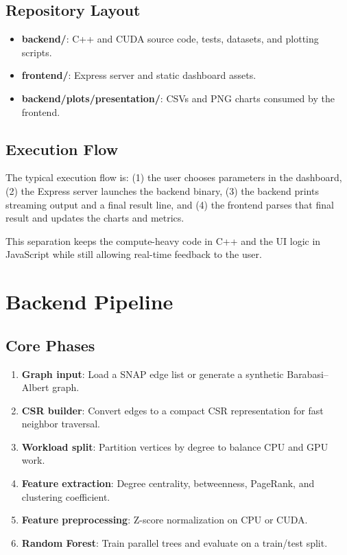 \documentclass[11pt]{article}
\let\oldsection\section
\renewcommand{\section}{\clearpage\oldsection}
\begin{document}
\subsection{Repository Layout}
\begin{itemize}
  \item \textbf{backend/}: C++ and CUDA source code, tests, datasets, and plotting scripts.
  \item \textbf{frontend/}: Express server and static dashboard assets.
  \item \textbf{backend/plots/presentation/}: CSVs and PNG charts consumed by the frontend.
\end{itemize}

\subsection{Execution Flow}
The typical execution flow is:
(1) the user chooses parameters in the dashboard, (2) the Express server launches the backend binary, (3) the backend prints streaming output and a final result line, and (4) the frontend parses that final result and updates the charts and metrics.

This separation keeps the compute-heavy code in C++ and the UI logic in JavaScript while still allowing real-time feedback to the user.

\section{Backend Pipeline}
\subsection{Core Phases}
\begin{enumerate}
  \item \textbf{Graph input}: Load a SNAP edge list or generate a synthetic Barabasi--Albert graph.
  \item \textbf{CSR builder}: Convert edges to a compact CSR representation for fast neighbor traversal.
  \item \textbf{Workload split}: Partition vertices by degree to balance CPU and GPU work.
  \item \textbf{Feature extraction}: Degree centrality, betweenness, PageRank, and clustering coefficient.
  \item \textbf{Feature preprocessing}: Z-score normalization on CPU or CUDA.
  \item \textbf{Random Forest}: Train parallel trees and evaluate on a train/test split.
\end{enumerate}
\end{document}
